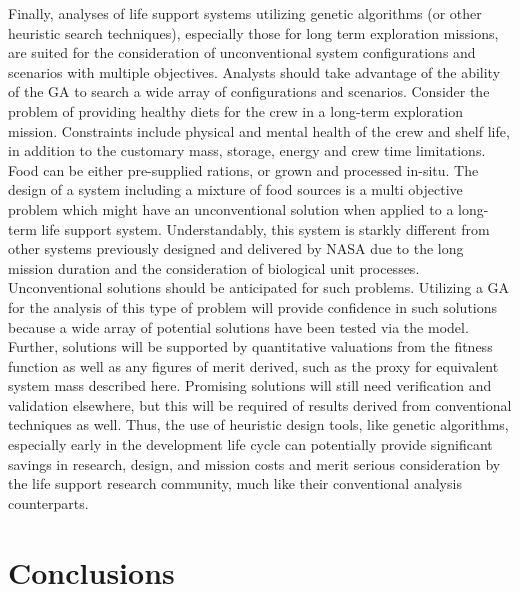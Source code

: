 \documentclass[submit]{aiaa}
\begin{document}
Finally, analyses of life support systems utilizing genetic algorithms (or other heuristic search techniques), especially those for long term exploration missions, are suited for the consideration of unconventional system configurations and scenarios with multiple objectives.
Analysts should  take advantage of the ability of the GA to search a wide array of configurations and scenarios.
Consider the problem of providing healthy diets for the crew in a long-term exploration mission.
Constraints include physical and mental health of the crew and shelf life, in addition to the customary mass, storage, energy and crew time limitations.
Food can be either pre-supplied rations, or grown and processed in-situ.
The design of a system including a mixture of food sources is a multi objective problem which might have an unconventional solution when applied to a long-term life support system.
Understandably, this system is starkly different from other systems previously designed and delivered by NASA due to the long mission duration and the consideration of biological unit processes.
Unconventional solutions should be anticipated for such problems.
Utilizing a GA for the analysis of this type of problem will provide confidence in such solutions because a wide array of potential solutions have been tested via the model.
Further, solutions will be supported by quantitative valuations from the fitness function as well as any figures of merit derived, such as the proxy for equivalent system mass described here.
Promising solutions will still need verification and validation elsewhere, but this will be required of results derived from conventional techniques as well.
Thus, the use of heuristic design tools, like genetic algorithms, especially early in the development life cycle can potentially provide significant savings in research, design, and mission costs and merit serious consideration by the life support
research community, much like their conventional analysis counterparts.

\section{Conclusions}
\end{document}

